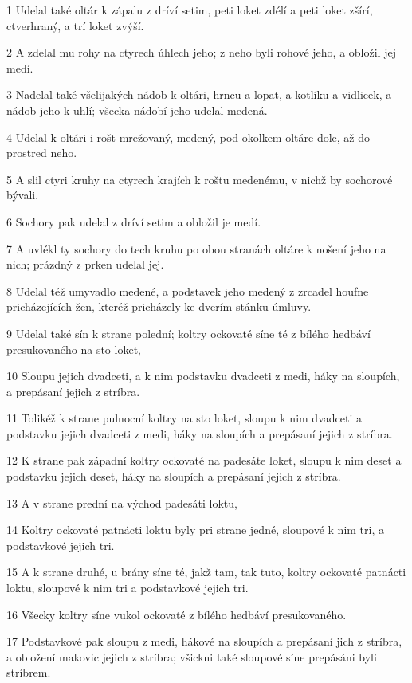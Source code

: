 \par 1 Udelal také oltár k zápalu z dríví setim, peti loket zdélí a peti loket zšírí, ctverhraný, a trí loket zvýší.
\par 2 A zdelal mu rohy na ctyrech úhlech jeho; z neho byli rohové jeho, a obložil jej medí.
\par 3 Nadelal také všelijakých nádob k oltári, hrncu a lopat, a kotlíku a vidlicek, a nádob jeho k uhlí; všecka nádobí jeho udelal medená.
\par 4 Udelal k oltári i rošt mrežovaný, medený, pod okolkem oltáre dole, až do prostred neho.
\par 5 A slil ctyri kruhy na ctyrech krajích k roštu medenému, v nichž by sochorové bývali.
\par 6 Sochory pak udelal z dríví setim a obložil je medí.
\par 7 A uvlékl ty sochory do tech kruhu po obou stranách oltáre k nošení jeho na nich; prázdný z prken udelal jej.
\par 8 Udelal též umyvadlo medené, a podstavek jeho medený z zrcadel houfne pricházejících žen, kteréž pricházely ke dverím stánku úmluvy.
\par 9 Udelal také sín k strane polední; koltry ockovaté síne té z bílého hedbáví presukovaného na sto loket,
\par 10 Sloupu jejich dvadceti, a k nim podstavku dvadceti z medi, háky na sloupích, a prepásaní jejich z stríbra.
\par 11 Tolikéž k strane pulnocní koltry na sto loket, sloupu k nim dvadceti a podstavku jejich dvadceti z medi, háky na sloupích a prepásaní jejich z stríbra.
\par 12 K strane pak západní koltry ockovaté na padesáte loket, sloupu k nim deset a podstavku jejich deset, háky na sloupích a prepásaní jejich z stríbra.
\par 13 A v strane prední na východ padesáti loktu,
\par 14 Koltry ockovaté patnácti loktu byly pri strane jedné, sloupové k nim tri, a podstavkové jejich tri.
\par 15 A k strane druhé, u brány síne té, jakž tam, tak tuto, koltry ockovaté patnácti loktu, sloupové k nim tri a podstavkové jejich tri.
\par 16 Všecky koltry síne vukol ockovaté z bílého hedbáví presukovaného.
\par 17 Podstavkové pak sloupu z medi, hákové na sloupích a prepásaní jich z stríbra, a obložení makovic jejich z stríbra; všickni také sloupové síne prepásáni byli stríbrem.

